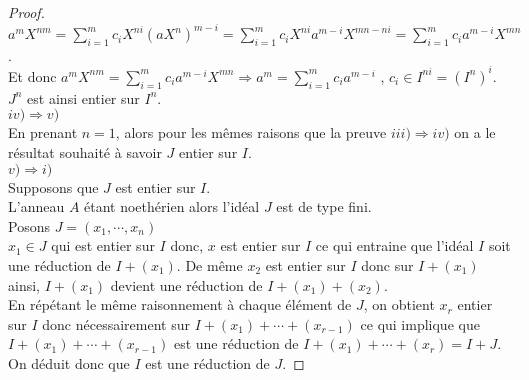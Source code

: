 \begin{proof}
	$a^m X^{nm} = \displaystyle \sum_{i=1}^{m}{c_i X^{ni} (aX^n)^{m-i}} = \displaystyle \sum_{i=1}^{m}{c_i X^{ni} a^{m-i} X^{mn-ni}} = \displaystyle \sum_{i=1}^{m}{c_i a^{m-i} X^{mn}}$.\\
	Et donc $a^m X^{nm} = \displaystyle \sum_{i=1}^{m}{c_i a^{m-i} X^{mn}} \Rightarrow a^m = \displaystyle \sum_{i=1}^{m}{c_i a^{m-i}}$ , $c_i \in I^{ni} = (I^n)^i$.\\
	$J^n$ est ainsi entier sur $I^n$.\\
	$iv) \Rightarrow v)$\\
	En prenant $n = 1$, alors pour les mêmes raisons que la preuve $iii) \Rightarrow iv)$ on a le résultat souhaité à savoir $J$ entier sur $I$.\\
	$v) \Rightarrow i)$\\
	Supposons que $J$ est entier sur $I$.\\
	L'anneau $A$ étant noethérien alors l'idéal $J$ est de type fini.\\ Posons $J = (x_1, \cdots ,x_n)$\\
	$x_1 \in J$ qui est entier sur $I$ donc, $x$ est entier sur $I$ ce qui entraine que l'idéal $I$ soit une réduction de $I + (x_1)$. De même $x_2$ est entier sur $I$ donc sur $I + (x_1)$ ainsi, $I + (x_1)$ devient une réduction de $I + (x_1) + (x_2)$.\\ En répétant le même raisonnement à chaque élément de $J$, on obtient $x_r$ entier sur $I$ donc nécessairement sur $I + (x_1) + \cdots +(x_{r-1})$ ce qui implique que $I + (x_1) + \cdots +(x_{r-1})$ est une réduction de $I + (x_1) + \cdots +(x_{r}) = I+J$.\\
	On déduit donc que $I$ est une réduction de $J$. 
\end{proof}

